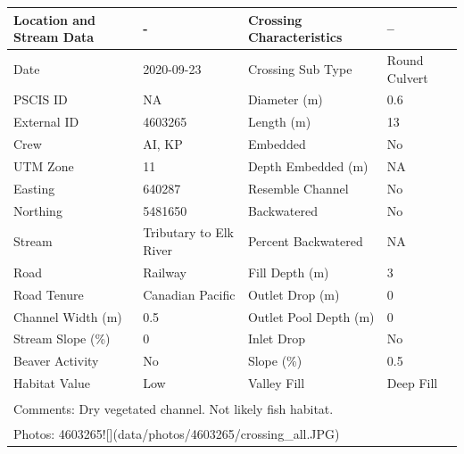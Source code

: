 \documentclass[
]{book}
\begin{document}
\begin{tabular}{llll}
\toprule
Location and Stream Data & - & Crossing Characteristics & --\\
\midrule
Date & 2020-09-23 & Crossing Sub Type & Round Culvert\\
PSCIS ID & NA & Diameter (m) & 0.6\\
External ID & 4603265 & Length (m) & 13\\
Crew & AI, KP & Embedded & No\\
UTM Zone & 11 & Depth Embedded (m) & NA\\
\addlinespace
Easting & 640287 & Resemble Channel & No\\
Northing & 5481650 & Backwatered & No\\
Stream & Tributary to Elk River & Percent Backwatered & NA\\
Road & Railway & Fill Depth (m) & 3\\
Road Tenure & Canadian Pacific & Outlet Drop (m) & 0\\
\addlinespace
Channel Width (m) & 0.5 & Outlet Pool Depth (m) & 0\\
Stream Slope (\%) & 0 & Inlet Drop & No\\
Beaver Activity & No & Slope (\%) & 0.5\\
Habitat Value & Low & Valley Fill & Deep Fill\\
\bottomrule
\multicolumn{4}{l}{\textsuperscript{} Comments: Dry vegetated channel. Not likely fish habitat.}\\
\multicolumn{4}{l}{\textsuperscript{} Photos: 4603265![](data/photos/4603265/crossing\_all.JPG)}\\
\end{tabular}
\end{document}
